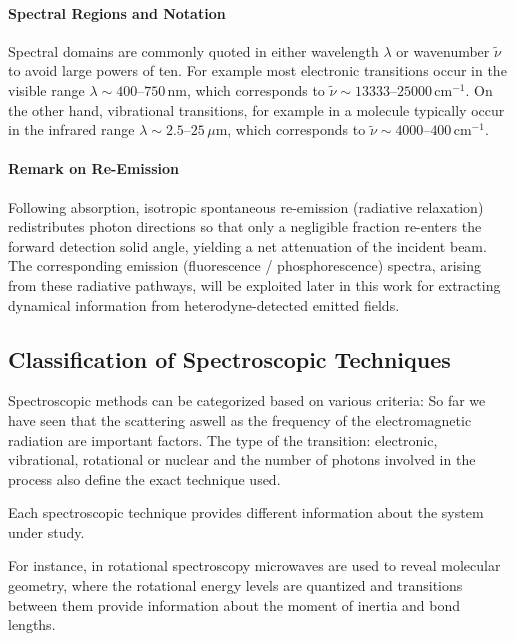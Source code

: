 

\paragraph{Spectral Regions and Notation}
\noindent Spectral domains are commonly quoted in either wavelength $\lambda$ or wavenumber $\tilde{\nu}$ to avoid large powers of ten.
For example most electronic transitions occur in the visible range $\lambda \sim 400$--$750\,\mathrm{nm}$, which corresponds to $\tilde{\nu} \sim 13333$--$25000\,\mathrm{cm}^{-1}$. On the other hand, vibrational transitions, for example in a molecule typically occur in the infrared range $\lambda \sim 2.5$--$25\,\mu\mathrm{m}$, which corresponds to $\tilde{\nu} \sim 4000$--$400\,\mathrm{cm}^{-1}$.

\paragraph{Remark on Re-Emission}
\noindent Following absorption, isotropic spontaneous re-emission (radiative relaxation) redistributes photon directions so that only a negligible fraction re-enters the forward detection solid angle, yielding a net attenuation of the incident beam. The corresponding emission (fluorescence / phosphorescence) spectra, arising from these radiative pathways, will be exploited later in this work for extracting dynamical information from heterodyne-detected emitted fields.

\subsection{Classification of Spectroscopic Techniques}
\label{subsec:spectroscopy_classification}

\noindent Spectroscopic methods can be categorized based on various criteria:
So far we have seen that the scattering aswell as the frequency of the electromagnetic radiation are important factors. The type of the transition: electronic, vibrational, rotational or nuclear and the number of photons involved in the process also define the exact technique used.

\noindent Each spectroscopic technique provides different information about the system under study.

For instance, in rotational spectroscopy microwaves are used to reveal molecular geometry, where the rotational energy levels are quantized and transitions between them provide information about the moment of inertia and bond lengths.

